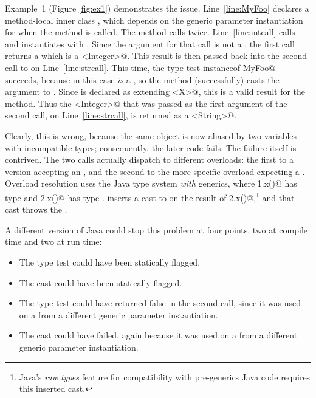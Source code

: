 Example~1 (Figure \ref{fig:ex1}) demonstrates the issue.
Line~\ref{line:MyFoo} declares a method-local inner class
\Q@MyFoo@, which depends on the generic parameter instantiation for \Q@X@ when the method is called.
The \Q@main@ method calls \Q@m@ twice. Line~\ref{line:intcall} calls \Q@m@ and instantiates \Q@X@ with \Q@Integer@.
Since the \Q@other@ argument for that call is not a \Q@MyFoo@, the first call returns
a \Q@MyFoo@ which is a \Q@Foo<Integer>@.
This result is then passed back into the second call to \Q@m@ on Line~\ref{line:strcall}.
This time, the type test \Q@other instanceof MyFoo@ succeeds, because \Q@other@ in this case \emph{is} a \Q@MyFoo@,
so the method (successfully) casts the \Q@other@ argument to \Q@MyFoo@.
Since \Q@MyFoo@ is declared as extending \Q@Foo<X>@, this is a valid result for the method.
Thus the \Q@Foo<Integer>@ that was passed as the first argument of the second call, on Line~\ref{line:strcall}, is returned
as a \Q@Foo<String>@.

Clearly, this is wrong, because the same object is now aliased by two variables with incompatible types; consequently, the later code fails.
The failure itself is contrived.
The two \Q@println@ calls actually dispatch to different overloads:
the first to a version accepting an \Q@Object@, and the second to the more specific overload expecting a \Q@String@.
Overload resolution uses the Java type system \emph{with} generics, where \Q@r1.x()@ has type \Q@Integer@ and \Q@r2.x()@ has type \Q@String@.
\javac inserts a cast to \Q@String@ on the result of \Q@r2.x()@,\footnote{Java's \emph{raw types} feature for compatibility with pre-generics Java code requires this inserted cast.} and that cast throws the \Q@ClassCastException@.

A different version of Java could stop this problem at four points, two at compile time and two at run time:
\begin{itemize}
\item The type test could have been statically flagged.
\item The cast could have been statically flagged.
\item The type test could have returned false in the second call, since it was used on a \Q@MyFoo@ from a different generic parameter instantiation.
\item The cast could have failed, again because it was used on a \Q@MyFoo@ from a different generic parameter instantiation.
\end{itemize}

